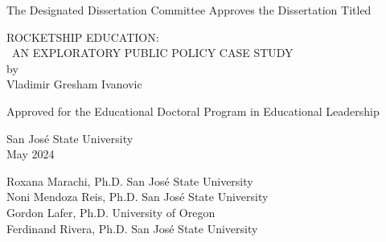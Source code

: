 
\thispagestyle{empty}

\begin{center}
The Designated Dissertation Committee Approves the Dissertation Titled\\
\vspace{2\baselineskip}

ROCKETSHIP EDUCATION:\\\vspace{1ex}
~AN EXPLORATORY PUBLIC POLICY CASE STUDY\\
by\\
Vladimir Gresham Ivanovic\\
\vspace{2\baselineskip}

Approved for the Educational Doctoral Program in Educational Leadership\\
\vspace{2\baselineskip}

San José State University\\
\vspace{2\baselineskip}
May 2024\\
\vspace{3\baselineskip}
\end{center}

Roxana Marachi, Ph.D. \hfill{} San José State University\\

Noni Mendoza Reis, Ph.D.\hfill{} San José State University\\

Gordon Lafer, Ph.D.\hfill{} University of Oregon\\

Ferdinand Rivera, Ph.D.\hfill{} San José State University\\

